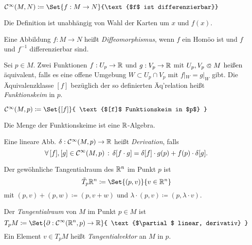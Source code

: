 \documentclass{cheat-sheet}
\begin{document}
\begin{nota}
  $\mathcal{C}^\infty(M, N) \coloneqq \Set{f : M \to N}{\text{$f$ ist differenzierbar}}$
\end{nota}

\begin{bem}
  Die Definition ist unabhängig von Wahl der Karten um $x$ und $f(x)$.
\end{bem}

\begin{defn}
  Eine Abbildung $f : M \to N$ heißt \emph{Diffeomorphismus}, wenn $f$ ein Homöo ist und $f$ und $f^{-1}$ differenzierbar sind.
\end{defn}


\begin{defn}
  Sei $p \in M$. Zwei Funktionen $f : U_p \to \mathbb{R}$ und $g : V_p \to \mathbb{R}$ mit $U_p, V_p \opn M$ heißen äquivalent, falls es eine offene Umgebung $W \subset U_p \cap V_p$ mit $f|_W = g|_W$ gibt. Die Äquivalenzklasse $[f]$ bezüglich der so definierten Äq'relation heißt \emph{Funktionskeim} in $p$.
\end{defn}

\begin{nota}
  $\mathcal{C}^\infty(M, p) \coloneqq \Set{ [f] }{ \text{$[f]$ Funktionskeim in $p$} }$
\end{nota}

\begin{bem}
  Die Menge der Funktionskeime ist eine $\mathbb{R}$-Algebra.
\end{bem}

\begin{defn}
  Eine lineare Abb. $\delta : \mathcal{C}^\infty(M, p) \to \mathbb{R}$ heißt \emph{Derivation}, falls
  \[ \forall \, {[f], [g] \in \mathcal{C}^\infty(M, p)} \,:\, \delta[f \cdot g] = \delta[f] \cdot g(p) + f(p) \cdot \delta[g]. \]
\end{defn}

\begin{defn}
  Der gewöhnliche Tangentialraum des $\mathbb{R}^n$ im Punkt $p$ ist
  \[ \tilde{T}_p \R^n \coloneqq \Set{(p, v)}{v \in \R^n} \]
  mit $(p, v) + (p, w) \coloneqq (p, v + w)$ und $\lambda \cdot (p, v) \coloneqq (p, \lambda \cdot v)$.
\end{defn}

\begin{defn}
  Der \emph{Tangentialraum} von $M$ im Punkt $p \in M$ ist
  \[ T_p M \coloneqq \Set{ \partial : \mathcal{C}^\infty(\R^n, p) \to \R }{ \text{$\partial$ linear, derivativ} } \]
  Ein Element $v \in T_p M$ heißt \emph{Tangentialvektor} an $M$ in $p$.
\end{defn}
\end{document}
